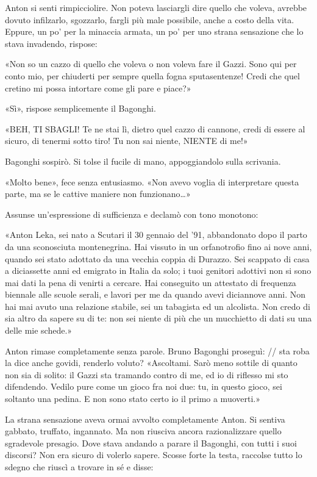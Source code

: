 Anton si senti rimpicciolire. Non poteva lasciargli dire quello che voleva, avrebbe dovuto infilzarlo, sgozzarlo, fargli più male possibile, anche a costo della vita. Eppure, un po' per la minaccia armata, un po' per uno strana sensazione che lo stava invadendo, rispose:

«Non so un cazzo di quello che voleva o non voleva fare il Gazzi. Sono qui per conto mio, per chiuderti per sempre quella fogna sputasentenze! Credi che quel cretino mi possa intortare come gli pare e piace?»

«Sì», rispose semplicemente il Bagonghi.

«BEH, TI SBAGLI! Te ne stai lì, dietro quel cazzo di cannone, credi di essere al sicuro, di tenermi sotto tiro! Tu non sai niente, NIENTE di me!»

Bagonghi sospirò. Si tolse il fucile di mano, appoggiandolo sulla scrivania.

«Molto bene», fece senza entusiasmo. «Non avevo voglia di interpretare questa parte, ma se le cattive maniere non funzionano\ldots»

Assunse un'espressione di sufficienza e declamò con tono monotono:

«Anton Leka, sei nato a Scutari il 30 gennaio del '91, abbandonato dopo il parto da una sconosciuta montenegrina. Hai vissuto in un orfanotrofio fino ai nove anni, quando sei stato adottato da una vecchia coppia di Durazzo. Sei scappato di casa a diciassette anni ed emigrato in Italia da solo; i tuoi genitori adottivi non si sono mai dati la pena di venirti a cercare. Hai conseguito un attestato di frequenza biennale alle scuole serali, e lavori per me da quando avevi diciannove anni. Non hai mai avuto una relazione stabile, sei un tabagista ed un alcolista. Non credo di sia altro da sapere su di te: non sei niente di più che un mucchietto di dati su una delle mie schede.»

Anton rimase completamente senza parole. Bruno Bagonghi proseguì:
// sta roba la dice anche govidi, renderlo voluto?
«Ascoltami. Sarò meno sottile di quanto non sia di solito: il Gazzi sta tramando contro di me, ed io di riflesso mi sto difendendo. Vedilo pure come un gioco fra noi due: tu, in questo gioco, sei soltanto una pedina. E non sono stato certo io il primo a muoverti.»

La strana sensazione aveva ormai avvolto completamente Anton. Si sentiva gabbato, truffato, ingannato. Ma non riusciva ancora razionalizzare quello sgradevole presagio. Dove stava andando a parare il Bagonghi, con tutti i suoi discorsi? Non era sicuro di volerlo sapere. Scosse forte la testa, raccolse tutto lo sdegno che riuscì a trovare in sé e disse:

